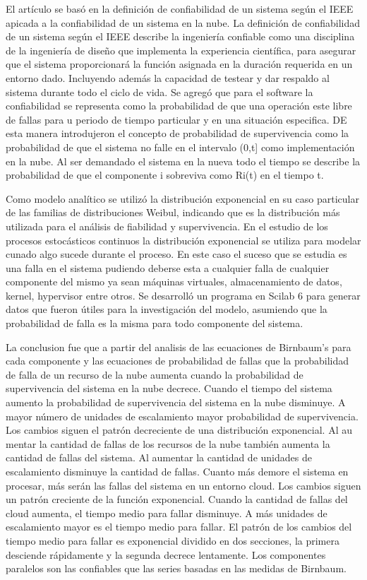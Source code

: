 El artículo  se basó en la definición de confiabilidad de un sistema según el IEEE apicada a la confiabilidad de un sistema en la nube. La definición de confiabilidad de un sistema según el IEEE describe la ingeniería confiable como una disciplina de la ingeniería de diseño que implementa la experiencia científica, para asegurar que el sistema proporcionará la función asignada en la duración requerida en un entorno dado. Incluyendo además la capacidad de testear y dar respaldo al sistema durante todo el ciclo de vida. Se agregó que para el software la confiabilidad se representa como la probabilidad de que una operación este libre de fallas para u periodo de tiempo particular y en una situación especifica.
DE esta manera introdujeron el concepto de probabilidad de supervivencia como la probabilidad de que el sistema no falle en el intervalo (0,t]  como implementación en la nube. Al ser demandado el sistema en la nueva todo el tiempo se describe la probabilidad de que el componente i sobreviva como Ri(t) en el tiempo t.
\par


Como modelo analítico se utilizó la distribución exponencial en su caso particular de las familias de distribuciones Weibul, indicando que es la distribución más utilizada para el análisis de fiabilidad y supervivencia. En el estudio de los procesos estocásticos continuos la distribución exponencial se utiliza para modelar cunado algo sucede durante el proceso. En este caso el suceso que se estudia es una falla en el sistema pudiendo deberse esta a cualquier falla de cualquier componente del mismo ya sean máquinas virtuales, almacenamiento de datos, kernel, hypervisor entre otros.
Se desarrolló un programa en Scilab 6 para generar datos que fueron útiles para la investigación del modelo, asumiendo que la probabilidad de falla es la misma para todo componente del sistema.
\par


La conclusion fue que a partir del analisis de las ecuaciones de Birnbaum’s para cada componente y las ecuaciones de probabilidad de fallas que la probabilidad de falla de un recurso de la nube aumenta cuando la probabilidad de supervivencia del sistema en la nube decrece. Cuando el tiempo del sistema aumento la probabilidad de supervivencia del sistema en la nube disminuye. A mayor número de unidades de escalamiento mayor probabilidad de supervivencia. Los cambios siguen el patrón decreciente de una  distribución exponencial. Al au mentar la cantidad de fallas de los recursos de la nube también aumenta la cantidad de fallas del sistema. Al aumentar la cantidad de unidades de escalamiento disminuye la cantidad de fallas. Cuanto más demore el sistema en procesar, más serán las fallas del sistema en un entorno cloud. Los cambios siguen un patrón creciente de la función exponencial. Cuando la cantidad de fallas del cloud aumenta, el tiempo medio para fallar disminuye. A más unidades de escalamiento mayor es el tiempo medio para fallar. El patrón de los cambios del tiempo medio para fallar es exponencial dividido en dos secciones, la primera desciende rápidamente y la segunda decrece lentamente. Los componentes paralelos son las confiables que las series basadas en las medidas de Birnbaum.
\par
